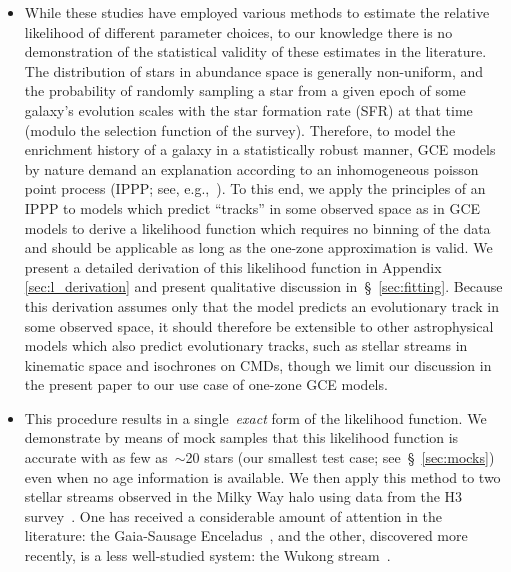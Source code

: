 \documentclass[ms.tex]{subfiles}
\begin{document}
\begin{itemize}
	\item While these studies have employed various methods to estimate the
	relative likelihood of different parameter choices, to our knowledge there
	is no demonstration of the statistical validity of these estimates in the
	literature.
	The distribution of stars in abundance space is generally non-uniform, and
	the probability of randomly sampling a star from a given epoch of some
	galaxy's evolution scales with the star formation rate (SFR) at that time
	(modulo the selection function of the survey).
	Therefore, to model the enrichment history of a galaxy in a statistically
	robust manner, GCE models by nature demand an explanation according to an
	inhomogeneous poisson point process (IPPP; see, e.g.,~\citealp{Press2007}).
	To this end, we apply the principles of an IPPP to models which predict
	``tracks'' in some observed space as in GCE models to derive a likelihood
	function which requires no binning of the data and should be applicable as
	long as the one-zone approximation is valid.
	We present a detailed derivation of this likelihood function in Appendix
	\ref{sec:l_derivation} and present qualitative discussion
	in~\S~\ref{sec:fitting}.
	Because this derivation assumes only that the model predicts an
	evolutionary track in some observed space, it should therefore be
	extensible to other astrophysical models which also predict evolutionary
	tracks, such as stellar streams in kinematic space and isochrones on CMDs,
	though we limit our discussion in the present paper to our use case of
	one-zone GCE models.

	\item This procedure results in a single~\textit{exact} form of the
	likelihood function.
	We demonstrate by means of mock samples that this likelihood function is
	accurate with as few as~$\sim$20 stars (our smallest test case;
	see~\S~\ref{sec:mocks}) even when no age information is available.
	We then apply this method to two stellar streams observed in the Milky Way
	halo using data from the H3 survey~\citep{Conroy2019}.
	One has received a considerable amount of attention in the literature: the
	Gaia-Sausage Enceladus~\citep[GSE;][]{Belokurov2018, Helmi2018}, and
	the other, discovered more recently, is a less well-studied system: the
	Wukong stream~\citep{Naidu2020, Naidu2022}.



\end{itemize}
\end{document}
